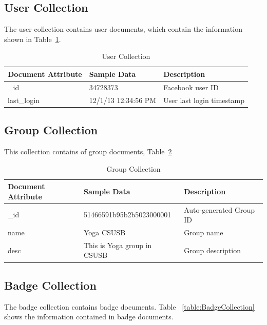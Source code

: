 \subsection{User Collection}
The user collection contains user documents, which contain the information shown in Table~\ref{table:UserCollection}.

\begin{table}[H]
\caption{User Collection}
\vspace{-0.2in}
\textbf{ }
\begin{center}
\begin{tabular}{ | l | l |  l | }
\hline
Document Attribute & Sample Data & Description \\ \hline
{\_}id & 34728373 & Facebook user ID \\ \hline
last{\_}login & 12/1/13 12:34:56 PM & User last login timestamp   \\ \hline
\end{tabular}
\label{table:UserCollection}
\end{center}
\end{table}

\subsection{Group Collection}
This collection contains of group documents,  Table~\ref{table:GroupCollection}

\begin{table}[H]
\caption{Group Collection}\label{table:GroupCollection}
\vspace{-0.2in}
\textbf{ }
\begin{center}
\begin{tabular}{ | l | l |  l | }
\hline
Document Attribute & Sample Data & Description \\ \hline
{\_}id &  51466591b95b2b5023000001 & Auto-generated Group ID \\ \hline
name & Yoga CSUSB & Group name   \\ \hline
desc & This is Yoga group in CSUSB & Group description   \\ \hline
\end{tabular}
\end{center}
\end{table}


\subsection{Badge Collection}
The badge collection contains badge documents. Table ~\ref{table:BadgeCollection} shows the information contained in badge documents.

